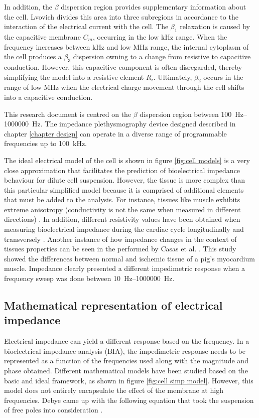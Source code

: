 In addition, the $\beta$ dispersion region provides supplementary information about the cell. Lvovich \cite{lvovich2012impedance} divides this area into three subregions in accordance to the interaction of the electrical current with the cell. The $\beta_1$ relaxation is caused by the capacitive membrane $C_m$, occurring in the low \si{\kilo\hertz} range. When the frequency increases between \si{\kilo\hertz} and low \si{\mega\hertz} range, the internal cytoplasm of the cell produces a $\beta_3$ dispersion owning to a change from resistive to capacitive conduction. However, this capacitive component is often disregarded, thereby simplifying the model into a resistive element $R_i$. Ultimately, $\beta_2$ occurs in the range of low \si{\mega\hertz} when the electrical charge movement through the cell shifts into a capacitive conduction.

This research document is centred on the $\beta$ dispersion region between \SIrange[scientific-notation = engineering]{100}{1000000}{\hertz}. The impedance plethysmography device designed described in chapter \ref{chapter design} can operate in a diverse range of programmable frequencies up to \SI{100}{\kHz}. 

The ideal electrical model of the cell is shown in figure \ref{fig:cell models} is a very close approximation that facilitates the prediction of bioelectrical impedance behaviour for dilute cell suspension. However, the tissue is more complex than this particular simplified model because it is comprised of additional elements that must be added to the analysis. For instance, tissues like muscle exhibits extreme anisotropy (conductivity is not the same when measured in different directions) \cite{lvovich2012impedance,dean2008electrical,foster1995dielectric}. In addition, different resistivity values have been obtained when measuring bioelectrical impedance during the cardiac cycle longitudinally and transversely \cite{steendijk1993four}. Another instance of how impedance changes in the context of tissues properties can be seen in the performed by Casas et al. \cite{casas1999vivo}. This study showed the differences between normal and ischemic tissue of a pig's myocardium muscle. Impedance clearly presented a different impedimetric response when a frequency sweep was done between \SIrange[scientific-notation = engineering]{10}{1000000}{\hertz}. 

\subsection{Mathematical representation of electrical impedance}
Electrical impedance can yield a different response based on the frequency. In a bioelectrical impedance analysis (BIA), the impedimetric response needs to be represented as a function of the frequencies used along with the magnitude and phase obtained. Different mathematical models have been studied based on the basic and ideal framework, as shown in figure \ref{fig:cell simp model}. However, this model does not entirely encapsulate the effect of the membrane at high frequencies. Debye came up with the following equation that took the suspension of free poles into consideration \cite{bertemes2002tissue}.

